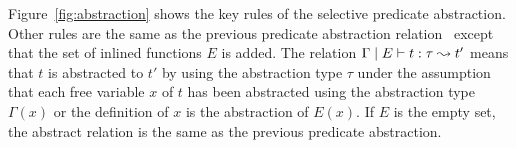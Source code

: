 
Figure~\ref{fig:abstraction} shows the key rules of the selective
predicate abstraction.  Other rules are the same as the previous
predicate abstraction relation~\cite{KobayashiPLDI2011} except that the
set of inlined functions $E$ is added.  The relation
${\Gamma} \mid {E} \vdash {t} : {\tau} \leadsto {t'}$ means that $t$ is abstracted to $t'$ by
using the abstraction type $\tau$ under the assumption that each free
variable $x$ of $t$ has been abstracted using the abstraction type
$\Gamma(x)$ or the definition of $x$ is the abstraction of $E(x)$.
If $E$ is the empty set, the abstract relation is the same as the
previous predicate abstraction.

